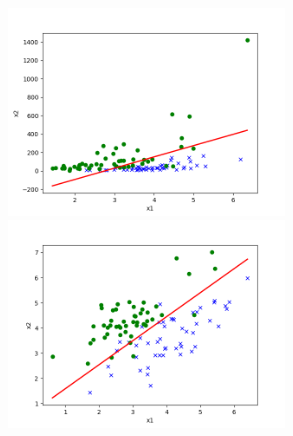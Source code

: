 \begin{answer}
\begin{figure}[h]
  \includegraphics[height=5.5cm]{../src/output/p01b_pred_1.png}
  \includegraphics[height=5.5cm]{../src/output/p01b_pred_2.png}
\end{figure}
\end{answer}
